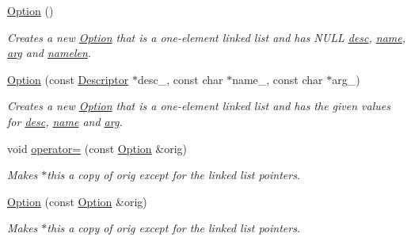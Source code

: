 \begin{DoxyCompactItemize}
\mbox{\label{classoption_1_1Option_aa2810152fc23b14175b115d1a7d38095}} 
\hyperlink{classoption_1_1Option_aa2810152fc23b14175b115d1a7d38095}{Option} ()
\begin{DoxyCompactList}\small\item\em Creates a new \hyperlink{classoption_1_1Option}{Option} that is a one-\/element linked list and has N\+U\+LL \hyperlink{classoption_1_1Option_af8d664a7b5de1425008b1812a90a0c23}{desc}, \hyperlink{classoption_1_1Option_a02a76b4896abd22d0ba8514362261de9}{name}, \hyperlink{classoption_1_1Option_a402be734987458364b0f473acae36238}{arg} and \hyperlink{classoption_1_1Option_a3aa2957b19ad5815873441b415d56050}{namelen}. \end{DoxyCompactList}\item 
\hyperlink{classoption_1_1Option_a385221e2a8f37c548f0d5777bfddb216}{Option} (const \hyperlink{structoption_1_1Descriptor}{Descriptor} $\ast$desc\+\_\+, const char $\ast$name\+\_\+, const char $\ast$arg\+\_\+)
\begin{DoxyCompactList}\small\item\em Creates a new \hyperlink{classoption_1_1Option}{Option} that is a one-\/element linked list and has the given values for \hyperlink{classoption_1_1Option_af8d664a7b5de1425008b1812a90a0c23}{desc}, \hyperlink{classoption_1_1Option_a02a76b4896abd22d0ba8514362261de9}{name} and \hyperlink{classoption_1_1Option_a402be734987458364b0f473acae36238}{arg}. \end{DoxyCompactList}\item 
void \hyperlink{classoption_1_1Option_adb4b44f3778df8f28a04c48bd1b4a72b}{operator=} (const \hyperlink{classoption_1_1Option}{Option} \&orig)
\begin{DoxyCompactList}\small\item\em Makes {\ttfamily $\ast$this} a copy of {\ttfamily orig} except for the linked list pointers. \end{DoxyCompactList}\item 
\hyperlink{classoption_1_1Option_a4053240fecad1a3b1d8e4dc06b7aa8c4}{Option} (const \hyperlink{classoption_1_1Option}{Option} \&orig)
\begin{DoxyCompactList}\small\item\em Makes {\ttfamily $\ast$this} a copy of {\ttfamily orig} except for the linked list pointers. \end{DoxyCompactList}\end{DoxyCompactItemize}
